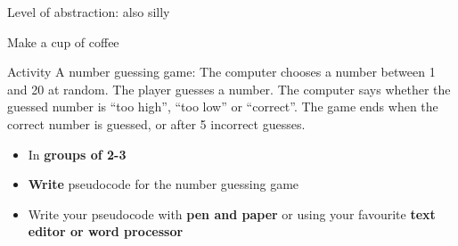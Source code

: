 \begin{frame}{Level of abstraction: also silly}
	\begin{algorithmic}
		\State Make a cup of coffee
	\end{algorithmic}
\end{frame}

\begin{frame}{Activity}
	A number guessing game: The computer chooses a number between 1 and 20 at random.
	The player guesses a number.
	The computer says whether the guessed number is ``too high'', ``too low'' or ``correct''.
	The game ends when the correct number is guessed, or after 5 incorrect guesses.

	\begin{itemize}
		\item In \textbf{groups of 2-3}
		\item \textbf{Write} pseudocode for the number guessing game
		\item Write your pseudocode with \textbf{pen and paper} or using your favourite \textbf{text editor or word processor}
	\end{itemize}
\end{frame}

